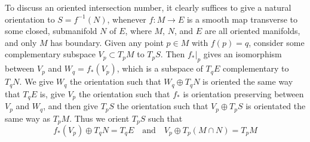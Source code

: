 To discuss an oriented intersection number, it clearly suffices to give a natural orientation to $S = f^{-1}(N)$, whenever $f: M \to E$ is a smooth map transverse to some closed, submanifold $N$ of $E$, where $M$, $N$, and $E$ are all oriented manifolds, and only $M$ has boundary. Given any point $p \in M$ with $f(p) = q$, consider some complementary subspace $V_p \subset T_p M$ to $T_p S$. Then $f_*|_p$ gives an isomorphism between $V_p$ and $W_q = f_*(V_p)$, which is a subspace of $T_qE$ complementary to $T_qN$. We give $W_q$ the orientation such that $W_q \oplus T_q N$ is oriented the same way that $T_q E$ is, give $V_p$ the orientation such that $f_*$ is orientation preserving between $V_p$ and $W_q$, and then give $T_p S$ the orientation such that $V_p \oplus T_p S$ is orientated the same way as $T_p M$. Thus we orient $T_p S$ such that
%
\[ f_*(V_p) \oplus T_q N = T_q E \quad\text{and}\quad V_p \oplus T_p (M \cap N) = T_p M \]

